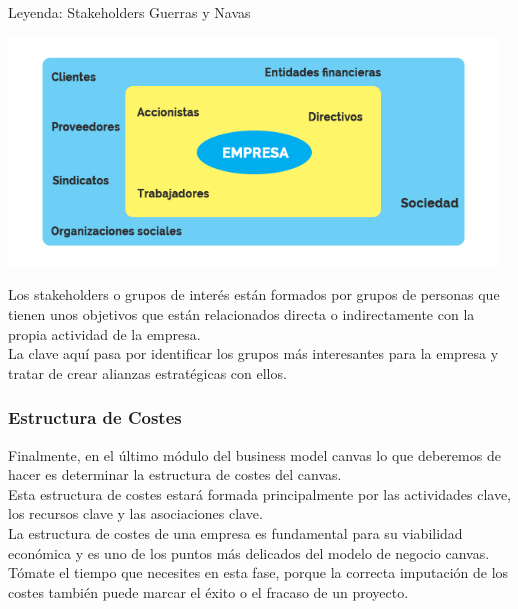 \documentclass[preprint,12pt]{elsarticle}
\begin{document}
Leyenda: Stakeholders Guerras y Navas\\

\begin{center}
	\includegraphics[width=13cm]{./Imagenes/ang2.png}
\end{center}
	
Los stakeholders o grupos de interés están formados por grupos de personas que tienen unos objetivos que están relacionados directa o indirectamente con la propia actividad de la empresa.\\

La clave aquí pasa por identificar los grupos más interesantes para la empresa y tratar de crear alianzas estratégicas con ellos.\\

\subsubsection{Estructura de Costes}

Finalmente, en el último módulo del business model canvas lo que deberemos de hacer es determinar la estructura de costes del canvas.\\

Esta estructura de costes estará formada principalmente por las actividades clave, los recursos clave y las asociaciones clave.\\

La estructura de costes de una empresa es fundamental para su viabilidad económica y es uno de los puntos más delicados del modelo de negocio canvas.\\

Tómate el tiempo que necesites en esta fase, porque la correcta imputación de los costes también puede marcar el éxito o el fracaso de un proyecto.\\



	
\end{document}
